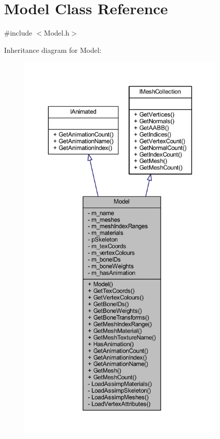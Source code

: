\hypertarget{class_model}{}\section{Model Class Reference}
\label{class_model}


{\ttfamily \#include $<$Model.\+h$>$}



Inheritance diagram for Model\+:\nopagebreak
\begin{figure}[H]
\begin{center}
\leavevmode
\includegraphics[height=550pt]{class_model__inherit__graph}
\end{center}
\end{figure}


